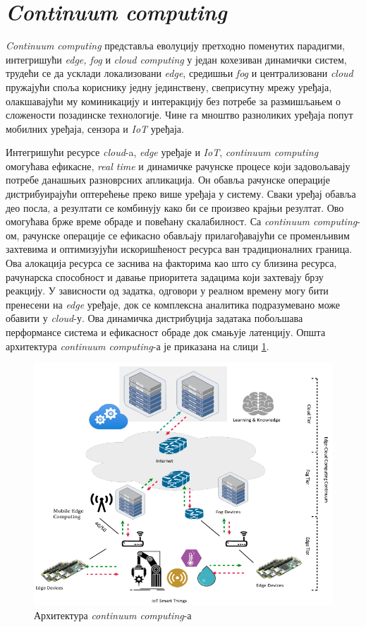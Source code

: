 \section{\textit{Continuum computing}}

\textit{Continuum computing} представља еволуцију претходно поменутих парадигми, интегришући  \textit{edge, fog} и \textit{cloud computing} у један кохезиван динамички систем, трудећи се да усклади локализовани \textit{edge}, средишњи \textit{fog} и централизовани \textit{cloud} пружајући споља кориснику једну јединствену, свеприсутну мрежу уређаја, олакшавајући му коминикацију и интеракцију без потребе за размишљањем о сложености позадинске технологије. Чине га мноштво разноликих уређаја попут мобилних уређаја, сензора и  \textit{IoT} уређаја.

Интегришући ресурсе \textit{cloud}-a, \textit{edge} уређаје и \textit{IoT}, \textit{continuum computing} омогућава ефикасне, \textit{real time} и динамичке рачунске процесе који задовољавају потребе данашњих разноврсних апликација. Он обавља рачунске операције дистрибуирајући оптерећење преко више уређаја у систему. Сваки уређај обавља део посла, а резултати се комбинују како би се произвео крајњи резултат. Ово омогућава брже време обраде и повећану скалабилност. Са \textit{continuum computing}-ом, рачунске операције се ефикасно обављају прилагођавајући се променљивим захтевима и оптимизујући искоришћеност ресурса ван традиционалних граница. Ова алокација ресурса се заснива на факторима као што су близина ресурса, рачунарска способност и давање приоритета задацима који захтевају брзу реакцију. У зависности од задатка, одговори у реалном времену могу бити пренесени на \textit{edge} уређаје, док се комплексна аналитика подразумевано може обавити у \textit{cloud}-у. Ова динамичка дистрибуција задатака побољшава перформансе система и ефикасност обраде док смањује латенцију. Општа архитектура \textit{continuum computing}-а је приказана на слици \ref{fig:continuum_arch}.

\begin{figure}[H]
    \centering
    \includegraphics[width=1\textwidth]{images/continuum_arch.png}
    \caption{Архитектура \textit{continuum computing}-а}
    \label{fig:continuum_arch}
\end{figure}

